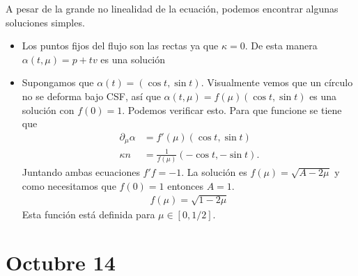 \documentclass{article}
\theoremstyle{mytheoremstyle}
\theoremstyle{mytheoremstyle}
\theoremstyle{myproblemstyle}
\begin{document}
A pesar de la grande no linealidad de la ecuación, podemos encontrar algunas soluciones simples.
\begin{itemize}
  \item Los puntos fijos del flujo son las rectas ya que $\kappa =0$. De esta manera $\alpha(t,\mu)=p+tv$ es una solución
  \item Supongamos que $\alpha(t)=(\cos t, \sin t).$ Visualmente vemos que un círculo no se deforma bajo CSF, así que $\alpha(t,\mu)=f(\mu)(\cos t, \sin t)$ es una solución con $f(0)=1$. Podemos verificar esto. Para que funcione se tiene que 
    \begin{align}
      \partial_\mu \alpha &= f'(\mu)(\cos t, \sin t) \\
      \kappa n &= \frac{1}{f(\mu)}(-\cos t, -\sin t).
    \end{align}
    Juntando ambas ecuaciones $f'f=-1$. La solución es $f(\mu)=\sqrt{A-2\mu}$ y como necesitamos que $f(0)=1$ entonces $A=1$.
    \begin{align}
    f(\mu)= \sqrt {1-2\mu}
    \end{align}
  Esta función está definida para $\mu\in [0,1/2]$.
\end{itemize}

\section{Octubre 14}
\end{document}
